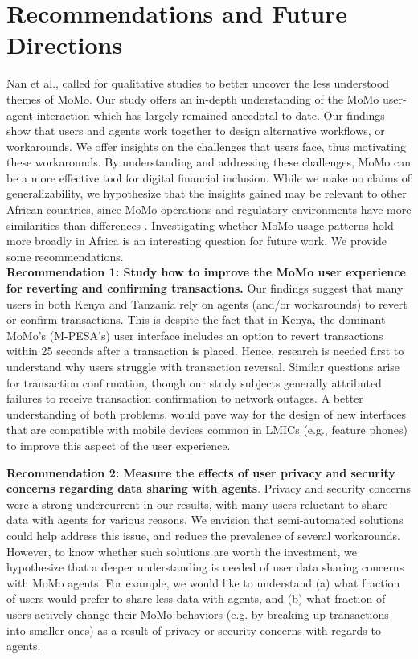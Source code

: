 \section {Recommendations and Future Directions}
\label{sec:summary}
Nan et al., \cite{nan2021we} called for qualitative studies to better uncover the less understood themes of MoMo. 
Our study offers an in-depth understanding of the MoMo user-agent interaction which has largely remained anecdotal to date. Our findings show that users and agents work together to design alternative workflows, or workarounds. We offer insights on the challenges that users face, thus motivating these workarounds. By understanding and addressing these challenges, MoMo can be a more effective tool for digital financial inclusion. 
While we make no claims of generalizability, we hypothesize that the insights gained may be relevant to other African countries, since MoMo operations and regulatory environments have more similarities than differences \cite{bowers2017regulators, nan2021we}. 
Investigating whether MoMo usage patterns hold more broadly in Africa is an interesting question for future work. We provide some recommendations. 
 \\
 \noindent \textbf{Recommendation 1: Study how to improve the MoMo user experience for reverting and confirming transactions.}
 Our findings suggest that many users in both Kenya and Tanzania rely on agents (and/or workarounds) to revert or confirm transactions.
 This is despite the fact that in Kenya, the dominant MoMo's (M-PESA's) user interface includes an option to revert transactions within 25 seconds after a transaction is placed.
Hence, research is needed first to understand why users struggle with transaction reversal. 
Similar questions arise for transaction confirmation, though our study subjects generally attributed failures to receive transaction confirmation to network outages.
A better understanding of both problems, would pave way for the design of new interfaces that are compatible with mobile devices common in LMICs (e.g., feature phones) to improve this aspect of the user experience. 

\noindent \textbf{Recommendation 2:  Measure the effects of user privacy and security concerns regarding data sharing with agents}. 
Privacy and security concerns were a strong undercurrent in our results, with many users reluctant to share data with agents for various reasons.
We envision that semi-automated solutions could help address this issue, and reduce the prevalence of several workarounds. 
However, to know whether such solutions are worth the investment, we hypothesize that a deeper understanding is needed of user data sharing concerns with MoMo agents. 
For example, we would like to understand (a) what fraction of users would prefer to share less data with agents, and (b) what fraction of users actively change their MoMo behaviors (e.g. by breaking up transactions into smaller ones) as a result of privacy or security concerns with regards to agents. 

